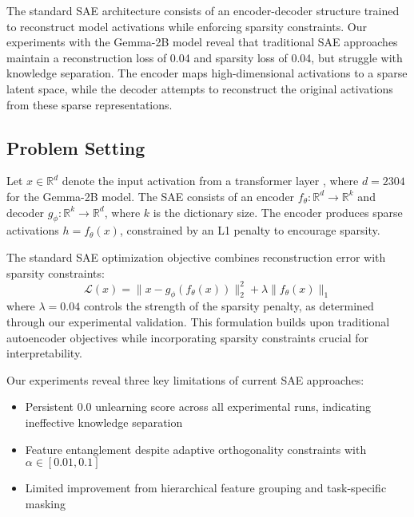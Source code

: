 \documentclass{article} %
\begin{document}
The standard SAE architecture consists of an encoder-decoder structure trained to reconstruct model activations while enforcing sparsity constraints. Our experiments with the Gemma-2B model reveal that traditional SAE approaches maintain a reconstruction loss of 0.04 and sparsity loss of 0.04, but struggle with knowledge separation. The encoder maps high-dimensional activations to a sparse latent space, while the decoder attempts to reconstruct the original activations from these sparse representations.

\subsection{Problem Setting}
Let $x \in \mathbb{R}^d$ denote the input activation from a transformer layer \cite{vaswani2017attention}, where $d=2304$ for the Gemma-2B model. The SAE consists of an encoder $f_\theta: \mathbb{R}^d \rightarrow \mathbb{R}^k$ and decoder $g_\phi: \mathbb{R}^k \rightarrow \mathbb{R}^d$, where $k$ is the dictionary size. The encoder produces sparse activations $h = f_\theta(x)$, constrained by an L1 penalty to encourage sparsity.

The standard SAE optimization objective combines reconstruction error with sparsity constraints:
\begin{equation}
    \mathcal{L}(x) = \|x - g_\phi(f_\theta(x))\|_2^2 + \lambda \|f_\theta(x)\|_1
\end{equation}
where $\lambda=0.04$ controls the strength of the sparsity penalty, as determined through our experimental validation. This formulation builds upon traditional autoencoder objectives \cite{goodfellow2016deep} while incorporating sparsity constraints crucial for interpretability.

Our experiments reveal three key limitations of current SAE approaches:
\begin{itemize}
    \item Persistent 0.0 unlearning score across all experimental runs, indicating ineffective knowledge separation
    \item Feature entanglement despite adaptive orthogonality constraints with $\alpha \in [0.01, 0.1]$
    \item Limited improvement from hierarchical feature grouping and task-specific masking
\end{itemize}
\end{document}
